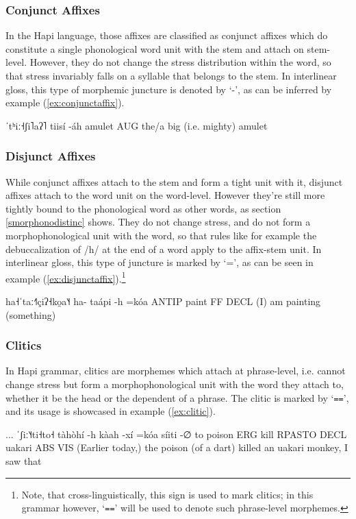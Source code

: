 \documentclass[a4paper, 12pt, oneside]{memoir}
\begin{document}
\subsubsection{Conjunct Affixes}
In the Hapi language, those affixes are classified as conjunct affixes which do constitute a single phonological word unit with the stem and attach on stem-level. However, they do not change the stress distribution within the word, so that stress invariably falls on a syllable that belongs to the stem. In interlinear gloss, this type of morphemic juncture is denoted by `-', as can be inferred by example (\ref{ex:conjunctaffix}).
\begin{examples}
\ex \label{ex:conjunctaffix}
\script ˈtʰiː˧ʃi˥aʔ˥
\bits tiisí -áh
\gloss amulet AUG
\tr the/a big (i.e. mighty) amulet
\end{examples}
\subsubsection{Disjunct Affixes}
While conjunct affixes attach to the stem and form a tight unit with it, disjunct affixes attach to the word unit on the word-level. However they're still more tightly bound to the phonological word as other words, as section \ref{smorphonodistinc} shows.  They do not change stress, and do not form a morphophonological unit with the word, so that rules like for example the debuccalization of /h/ at the end of a word apply to the affix-stem unit. In interlinear gloss, this type of juncture is marked by `=', as can be seen in example (\ref{ex:disjunctaffix}).\footnote{Note, that cross-linguistically, this sign is used to mark clitics; in this grammar however, `\texttt{==}' will be used to denote such phrase-level morphemes.}
\begin{examples}
\ex \label{ex:disjunctaffix}
\script ha˧ˈtaː˧˥çiʔ˧ko̯a˥˧
\bits ha- taápi -h =kóa
\gloss ANTIP paint FF DECL
\tr (I) am painting (something)
\end{examples}
\subsubsection{Clitics}
In Hapi grammar, clitics are morphemes which attach at phrase-level, i.e. cannot change stress but form a morphophonological unit with the word they attach to, whether it be the head or the dependent of a phrase. The clitic is marked by `\texttt{==}', and its usage is showcased in example (\ref{ex:clitic}).
\begin{examples}
\newbaarucmd{\cl}{\baarujuncture{\texttt{==}}}
\ex \label{ex:clitic}
\script ... ˈʃiː˥˧ti˧to˧
\bits tàhòhí -h kàah -xí =kóa síiti -∅ \cl to
\gloss poison ERG kill RPASTO DECL uakari ABS VIS
\tr (Earlier today,) the poison (of a dart) killed an uakari monkey, I saw that
\end{examples}
\end{document}
